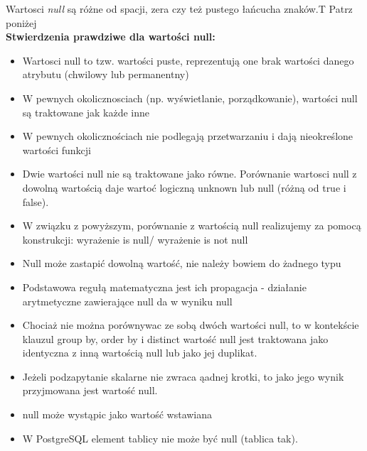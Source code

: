 {Wartosci \textit{null} są różne od spacji, zera czy też pustego łańcucha znaków.}{T}
{Patrz poniżej}{\\}
\noindent\textbf{Stwierdzenia prawdziwe dla wartości null:}
\begin{itemize}
	\item Wartosci null to tzw. wartości puste, reprezentują one brak wartości danego atrybutu
(chwilowy lub permanentny)
	\item W pewnych okolicznosciach (np. wyświetlanie, porządkowanie), wartości null są traktowane jak każde inne
	\item W pewnych okolicznościach nie podlegają przetwarzaniu i dają nieokreślone wartości funkcji
    \item Dwie wartości null nie są traktowane jako równe. Porównanie wartosci null z dowolną wartością daje wartoć logiczną unknown lub null (różną od true i false).
	\item W związku z powyższym, porównanie z wartością null realizujemy za pomocą konstrukcji:
wyrażenie is null/ wyrażenie is not null
	\item Null może zastapić dowolną wartość, nie należy bowiem do żadnego typu
	\item Podstawowa regułą matematyczna jest ich propagacja - działanie arytmetyczne zawierające null da w wyniku null
	\item Chociaż nie można porównywac ze sobą dwóch wartości null, to w kontekście klauzul group by, order by i distinct wartość null jest traktowana jako identyczna z inną wartością null lub jako jej duplikat.
	\item Jeżeli podzapytanie skalarne nie zwraca ąadnej krotki, to jako jego wynik
przyjmowana jest wartość null.
	\item null może wystąpic jako wartość wstawiana
	\item W PostgreSQL element tablicy nie może być null (tablica tak).
\end{itemize}


